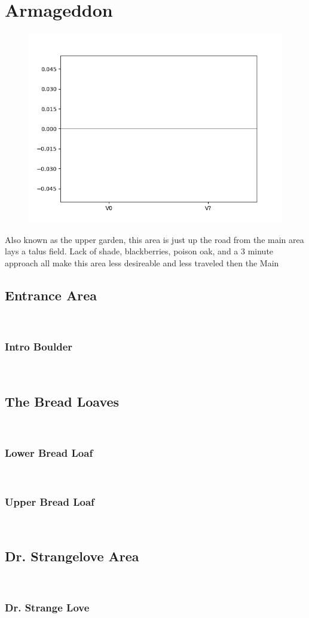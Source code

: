 \chapter{Armageddon}\label{a:Armageddon}
\lhead{\textcolor{\chapterColor}{\rule[-2pt]{\textwidth}{15pt}}}
\begin{figure}[h]
  \centering
    \includegraphics[width=\linewidth]{./maps/plots/Armageddon.png}
\end{figure}
Also known as the upper garden, this area is just up the road from the main area lays a talus field. Lack of shade, blackberries, poison oak, and a 3 minute approach all make this area less desireable and less traveled then the Main

\section{Entrance Area}\label{sa:Entrance Area}
\

\subsection*{Intro Boulder}\label{bf:Intro Boulder}
\

\section{The Bread Loaves}\label{sa:The Bread Loaves}
\

\subsection*{Lower Bread Loaf}\label{bf:Lower Bread Loaf}
\

\subsection*{Upper Bread Loaf}\label{bf:Upper Bread Loaf}
\

\section{Dr. Strangelove Area}\label{sa:Dr. Strangelove Area}
\

\subsection*{Dr. Strange Love}\label{bf:Dr. Strange Love}
\

\clearpage